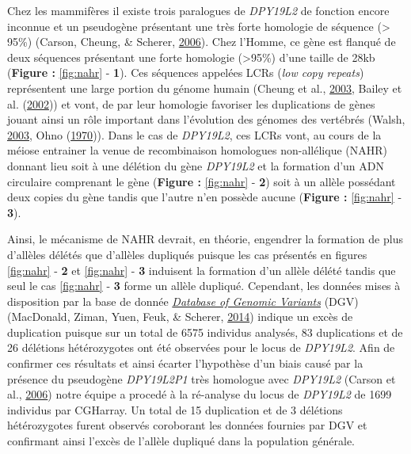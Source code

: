 \documentclass[12pt,twoside]{reedthesis}
\theoremstyle{definition}
\theoremstyle{definition}
\theoremstyle{remark}
\begin{document}
  Chez les mammifères il existe trois paralogues de \emph{DPY19L2} de
  fonction encore inconnue et un pseudogène présentant une très forte
  homologie de séquence (\textgreater{} 95\%) (Carson, Cheung, \& Scherer,
  \protect\hyperlink{ref-Carson2006}{2006}). Chez l'Homme, ce gène est
  flanqué de deux séquences présentant une forte homologie
  (\textgreater{}95\%) d'une taille de 28kb (\textbf{Figure :
  }\ref{fig:nahr} - \textbf{1}). Ces séquences appelées LCRs (\emph{low
  copy repeats}) représentent une large portion du génome humain (Cheung
  et al., \protect\hyperlink{ref-Cheung2003}{2003}, Bailey et al.
  (\protect\hyperlink{ref-Bailey2002}{2002})) et vont, de par leur
  homologie favoriser les duplications de gènes jouant ainsi un rôle
  important dans l'évolution des génomes des vertébrés (Walsh,
  \protect\hyperlink{ref-Walsh2003}{2003}, Ohno
  (\protect\hyperlink{ref-Ohno1970}{1970})). Dans le cas de
  \emph{DPY19L2}, ces LCRs vont, au cours de la méiose entrainer la venue
  de recombinaison homologues non-allélique (NAHR) donnant lieu soit à une
  délétion du gène \emph{DPY19L2} et la formation d'un ADN circulaire
  comprenant le gène (\textbf{Figure : }\ref{fig:nahr} - \textbf{2}) soit
  à un allèle possédant deux copies du gène tandis que l'autre n'en
  possède aucune (\textbf{Figure : }\ref{fig:nahr} - \textbf{3}).
  
  Ainsi, le mécanisme de NAHR devrait, en théorie, engendrer la formation
  de plus d'allèles délétés que d'allèles dupliqués puisque les cas
  présentés en figures \ref{fig:nahr} - \textbf{2} et \ref{fig:nahr} -
  \textbf{3} induisent la formation d'un allèle délété tandis que seul le
  cas \ref{fig:nahr} - \textbf{3} forme un allèle dupliqué. Cependant, les
  données mises à disposition par la base de donnée
  \href{http://dgv.tcag.ca/dgv/app/home}{\emph{Database of Genomic
  Variants}} (DGV) (MacDonald, Ziman, Yuen, Feuk, \& Scherer,
  \protect\hyperlink{ref-MacDonald2014}{2014}) indique un excès de
  duplication puisque sur un total de 6575 individus analysés, 83
  duplications et de 26 délétions hétérozygotes ont été observées pour le
  locus de \emph{DPY19L2}. Afin de confirmer ces résultats et ainsi
  écarter l'hypothèse d'un biais causé par la présence du pseudogène
  \emph{DPY19L2P1} très homologue avec \emph{DPY19L2} (Carson et al.,
  \protect\hyperlink{ref-Carson2006}{2006}) notre équipe a procedé à la
  ré-analyse du locus de \emph{DPY19L2} de 1699 individus par CGHarray. Un
  total de 15 duplication et de 3 délétions hétérozygotes furent observés
  coroborant les données fournies par DGV et confirmant ainsi l'excès de
  l'allèle dupliqué dans la population générale.
  
\end{document}

